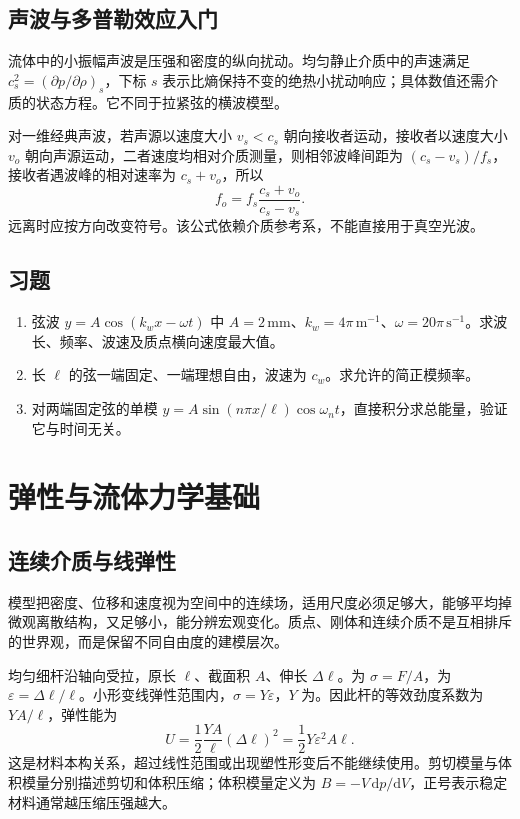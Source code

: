 \documentclass[UTF8,12pt,a4paper,fontset=fandol]{ctexbook}
\begin{document}
\section{声波与多普勒效应入门}
流体中的小振幅声波是压强和密度的纵向扰动。均匀静止介质中的声速满足 $c_s^2=(\partial p/\partial\rho)_s$，下标 $s$ 表示比熵保持不变的绝热小扰动响应；具体数值还需介质的状态方程。它不同于拉紧弦的横波模型。

对一维经典声波，若声源以速度大小 $v_s<c_s$ 朝向接收者运动，接收者以速度大小 $v_o$ 朝向声源运动，二者速度均相对介质测量，则相邻波峰间距为 $(c_s-v_s)/f_s$，接收者遇波峰的相对速率为 $c_s+v_o$，所以
\[
 f_o=f_s\frac{c_s+v_o}{c_s-v_s}.
\]
远离时应按方向改变符号。该公式依赖介质参考系，不能直接用于真空光波。

\section{习题}
\begin{enumerate}[label=\thechapter.\arabic*,ref=\thechapter.\arabic*]
\item\label{exr:mech-wave-data} 弦波 $y=A\cos(k_wx-\omega t)$ 中 $A=2\,\mathrm{mm}$、$k_w=4\pi\,\mathrm{m^{-1}}$、$\omega=20\pi\,\mathrm{s^{-1}}$。求波长、频率、波速及质点横向速度最大值。
\item\label{exr:mech-fixed-free} 长 $\ell$ 的弦一端固定、一端理想自由，波速为 $c_w$。求允许的简正模频率。
\item\label{exr:mech-wave-energy} 对两端固定弦的单模 $y=A\sin(n\pi x/\ell)\cos\omega_nt$，直接积分求总能量，验证它与时间无关。
\end{enumerate}

\chapter{弹性与流体力学基础}
\label{chap:mech-continuum}

\section{连续介质与线弹性}
模型把密度、位移和速度视为空间中的连续场，适用尺度必须足够大，能够平均掉微观离散结构，又足够小，能分辨宏观变化。质点、刚体和连续介质不是互相排斥的世界观，而是保留不同自由度的建模层次。

均匀细杆沿轴向受拉，原长 $\ell$、截面积 $A$、伸长 $\Delta\ell$。为 $\sigma=F/A$，为 $\varepsilon=\Delta\ell/\ell$。小形变线弹性范围内，$\sigma=Y\varepsilon$，$Y$ 为。因此杆的等效劲度系数为 $YA/\ell$，弹性能为
\[
 U=\frac12\frac{YA}{\ell}(\Delta\ell)^2=\frac12Y\varepsilon^2A\ell.
\]
这是材料本构关系，超过线性范围或出现塑性形变后不能继续使用。剪切模量与体积模量分别描述剪切和体积压缩；体积模量定义为 $B=-V\,\mathrm dp/\mathrm dV$，正号表示稳定材料通常越压缩压强越大。
\end{document}
